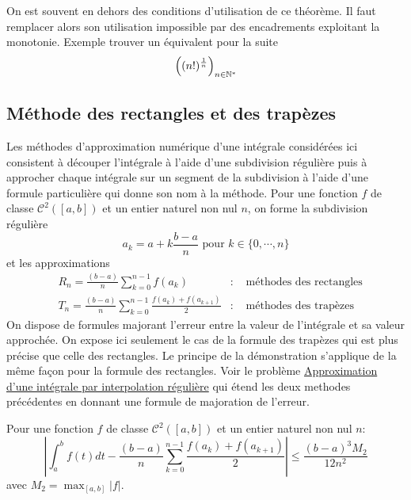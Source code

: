 \begin{rem}
 On est souvent en dehors des conditions d'utilisation de ce théorème. Il faut remplacer alors son utilisation impossible par des encadrements exploitant la monotonie.\newline
Exemple trouver un équivalent pour la suite
\begin{displaymath}
 \left( (n!)^{\frac{1}{n}}\right)_{n\in\mathbb{N}^*}
\end{displaymath}
\end{rem}

\subsection{Méthode des rectangles et des trapèzes}
Les méthodes d'approximation numérique d'une intégrale considérées ici consistent à découper l'intégrale à l'aide d'une subdivision régulière puis à approcher chaque intégrale sur un segment de la subdivision à l'aide d'une formule particulière qui donne son nom à la méthode.
Pour une fonction $f$ de classe $\mathcal C^2([a,b])$ et un entier naturel non nul $n$, on forme la subdivision régulière
\begin{displaymath}
 a_k = a+k\frac{b-a}{n}\text{ pour } k\in\{0,\cdots ,n\}
\end{displaymath}
et les approximations
\begin{align*}
 &R_n=\frac{(b-a)}{n}\sum_{k=0}^{n-1}f(a_k) &:&\text{ méthodes des rectangles}\\
&T_n=\frac{(b-a)}{n}\sum_{k=0}^{n-1}\frac{f(a_k)+f(a_{k+1})}{2} &:&\text{ méthodes des trapèzes}
\end{align*}
On dispose de formules majorant l'erreur entre la valeur de l'intégrale et sa valeur approchée. On expose ici seulement le cas de la formule des trapèzes qui est plus précise que celle des rectangles. Le principe de la démonstration s'applique de la même façon pour la formule des rectangles.\newline
Voir le problème \href{http://back.maquisdoc.net/data/devoirs_nicolair/Aintapprox.pdf}{Approximation d'une intégrale par interpolation régulière} qui étend les deux methodes précédentes en donnant une formule de majoration de l'erreur.
\begin{prop}
 Pour une fonction $f$ de classe $\mathcal C^2([a,b])$ et un entier naturel non nul $n$:
\begin{displaymath}
 \left\vert \int_a^bf(t)dt - \frac{(b-a)}{n}\sum_{k=0}^{n-1}\frac{f(a_k)+f(a_{k+1})}{2} \right\vert 
\leq \frac{(b-a)^3M_2}{12n^2}
\end{displaymath}
avec $M_2=\max_{[a,b]}|f|$.
\end{prop}
